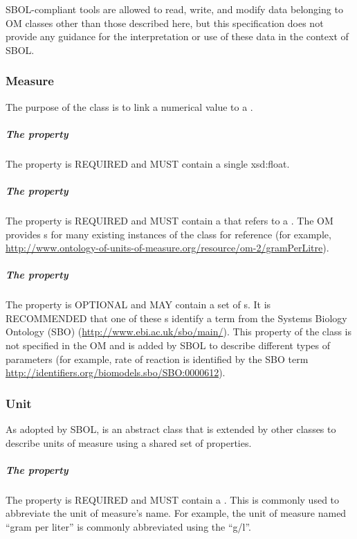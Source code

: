 SBOL-compliant tools are allowed to read, write, and modify data belonging to OM classes other than those described here, but this specification does not provide any guidance for the interpretation or use of these data in the context of SBOL.

\subsubsection{Measure}
\label{sec:Measure}

The purpose of the  class is to link a numerical value to a . 

\subparagraph{The  property}\label{sec:hasNumericalValue}
The  property is REQUIRED and MUST contain a single xsd:float.

\subparagraph{The  property}\label{sec:hasUnit:Measure}
The  property is REQUIRED and MUST contain a  that refers to a . The OM provides s for many existing instances of the  class for reference (for example, \url{http://www.ontology-of-units-of-measure.org/resource/om-2/gramPerLitre}).

\subparagraph{The  property}\label{sec:types:Measure}
The  property is OPTIONAL and MAY contain a set of s. It is RECOMMENDED that one of these s identify a term from the Systems Biology Ontology (SBO) (\url{http://www.ebi.ac.uk/sbo/main/}). This  property of the  class is not specified in the OM and is added by SBOL to describe different types of parameters (for example, rate of reaction is identified by the SBO term \url{http://identifiers.org/biomodels.sbo/SBO:0000612}).

\subsubsection{Unit}
\label{sec:Unit}

As adopted by SBOL,  is an abstract class that is extended by other classes to describe units of measure using a shared set of properties. 

\subparagraph{The  property}\label{sec:symbol:Unit}
The  property is REQUIRED and MUST contain a . This  is commonly used to abbreviate the unit of measure's name. For example, the unit of measure named ``gram per liter'' is commonly abbreviated using the  ``g/l''.


